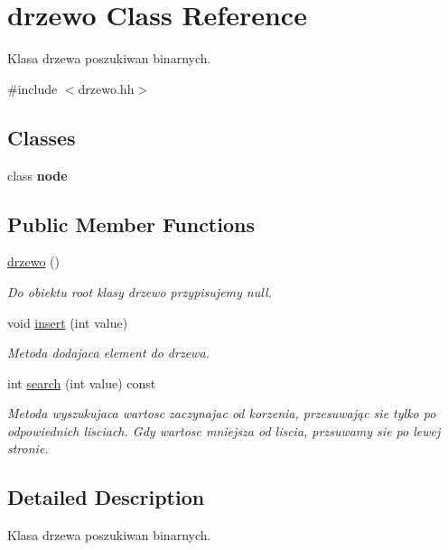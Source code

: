 \hypertarget{classdrzewo}{\section{drzewo \-Class \-Reference}
\label{classdrzewo}
}


\-Klasa drzewa poszukiwan binarnych.  




{\ttfamily \#include $<$drzewo.\-hh$>$}

\subsection*{\-Classes}
\begin{DoxyCompactItemize}
\item 
class {\bfseries node}
\end{DoxyCompactItemize}
\subsection*{\-Public \-Member \-Functions}
\begin{DoxyCompactItemize}
\item 
\hyperlink{classdrzewo_a555c14101f8c11cf9344ecf8f8cf87b0}{drzewo} ()
\begin{DoxyCompactList}\small\item\em \-Do obiektu root klasy drzewo przypisujemy null. \end{DoxyCompactList}\item 
void \hyperlink{classdrzewo_af7aa478f1841b9e2e65d7da24210e237}{insert} (int value)
\begin{DoxyCompactList}\small\item\em \-Metoda dodajaca element do drzewa. \end{DoxyCompactList}\item 
int \hyperlink{classdrzewo_ad4cd48881b257927ae34805c97cabe92}{search} (int value) const 
\begin{DoxyCompactList}\small\item\em \-Metoda wyszukujaca wartosc zaczynajac od korzenia, przesuwając sie tylko po odpowiednich lisciach. \-Gdy wartosc mniejsza od liscia, przsuwamy sie po lewej stronie. \end{DoxyCompactList}\end{DoxyCompactItemize}


\subsection{\-Detailed \-Description}
\-Klasa drzewa poszukiwan binarnych. 



